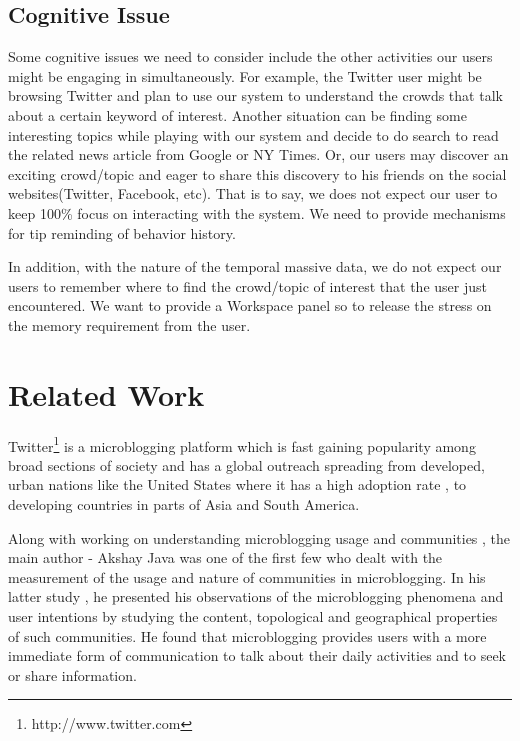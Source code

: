 \documentclass{sig-alternate}
\begin{document}
\subsection{Cognitive Issue}
Some cognitive issues we need to consider include the other activities our
users might be engaging in simultaneously. For example, the Twitter user might
be browsing Twitter and plan to use our system to understand the crowds that
talk about a certain keyword of interest. Another situation can be finding some
interesting topics while playing with our system and decide to do search to
read the related news article from Google or NY Times. Or, our users may
discover an exciting crowd/topic and eager to share this discovery to his
friends on the social websites(Twitter, Facebook, etc). That is to say, we does
not expect our user to keep 100\% focus on interacting with the system. We need
to provide mechanisms for tip reminding of behavior history. 

In addition, with the nature of the temporal massive data, we do not expect our
users to remember where to find the crowd/topic of interest that the user just
encountered. We want to provide a Workspace panel so to release the stress on
the memory requirement from the user.

\section{Related Work}
Twitter\footnote{http://www.twitter.com} is a microblogging platform which is
fast gaining popularity\cite{Oreilly:2009} among broad sections of society and
has a global outreach spreading from developed, urban nations like the United
States where it has a high adoption rate \cite{Java:2007}, to developing
countries in parts of Asia and South America.

Along with working on understanding microblogging usage and communities
\cite{Java:2007}, the main author - Akshay Java was one of the first few who
dealt with the measurement of the usage and nature of communities in
microblogging. In his latter study \cite{Java:2008}, he presented his
observations of the microblogging phenomena and user intentions by studying the
content, topological and geographical properties of such communities. He found
that microblogging provides users with a more immediate form of communication
to talk about their daily activities and to seek or share information.
\end{document}
